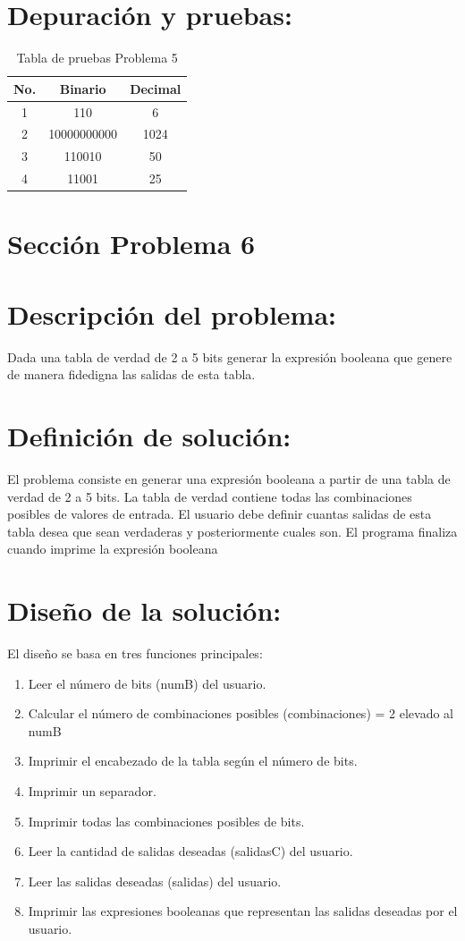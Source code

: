 \documentclass{IEEEcsmag}
\begin{document}
\section*{Depuración y pruebas:}
\begin{table}[h]
     \centering
     \begin{tabular}{|c|c|c|}
     \hline
        No. & Binario & Decimal\\
        \hline
        1  & 110 & 6\\
        \hline
        2  & 10000000000 & 1024\\
        \hline
        3  & 110010 & 50\\
        \hline
        4  & 11001 & 25\\
        \hline
     \end{tabular}
     \label{tab:my_label}
     \caption{Tabla de pruebas Problema 5}
 \end{table}
\section{Sección Problema 6}
\section*{Descripción del problema:}
Dada una tabla de verdad de 2 a 5 bits generar la expresión booleana que genere de manera fidedigna las salidas de esta tabla.
\section*{Definición de solución:}
El problema consiste en generar una expresión booleana a partir de una tabla de verdad de 2 a 5 bits. La tabla de verdad contiene todas las combinaciones posibles de valores de entrada. El usuario debe definir cuantas salidas de esta tabla desea que sean verdaderas y posteriormente cuales son. El programa finaliza cuando imprime la expresión booleana

\section*{Diseño de la solución:}
El diseño se basa en tres funciones principales:
\begin{enumerate}
\item Leer el número de bits (numB) del usuario.
\item Calcular el número de combinaciones posibles (combinaciones) = 2 elevado al numB
\item Imprimir el encabezado de la tabla según el número de bits.
\item Imprimir un separador.
\item Imprimir todas las combinaciones posibles de bits.
\item Leer la cantidad de salidas deseadas (salidasC) del usuario.
\item Leer las salidas deseadas (salidas) del usuario.
\item Imprimir las expresiones booleanas que representan las salidas deseadas por el usuario.
\end{enumerate}
\end{document}
